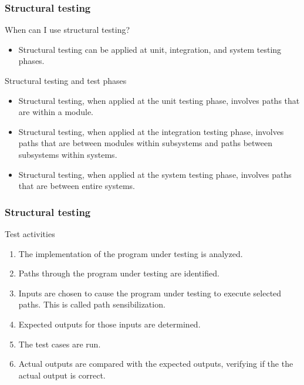 \begin{frame}
\frametitle{Structural testing}

\begin{block:fact}{When can I use structural testing?}
\begin{itemize}
	\item Structural testing can be applied at unit, integration, and system
	testing phases.
\end{itemize}
\end{block:fact}


\begin{block:fact}{Structural testing and test phases}
\begin{itemize}
	\item Structural testing, when applied at the unit testing phase,
	involves paths that are within a module.

	\item Structural testing, when applied at the integration testing phase,
	involves paths that are between modules within subsystems and paths
	between subsystems within systems.

	\item Structural testing, when applied at the system testing phase,
	involves paths that are between entire systems.
\end{itemize}
\end{block:fact}
\end{frame}


\begin{frame}[hasprev=true, hasnext=false]
\frametitle{Structural testing}

\begin{block:procedure}{Test activities}
\begin{enumerate}
	\item The implementation of the program under testing is analyzed.
	\item Paths through the program under testing are identified.
	\item Inputs are chosen to cause the program under testing to execute
	selected paths. This is called path sensibilization.
	\item Expected outputs for those inputs are determined.
	\item The test cases are run.
	\item Actual outputs are compared with the expected outputs, verifying if
	the the actual output is correct.
\end{enumerate}
\end{block:procedure}
\end{frame}
